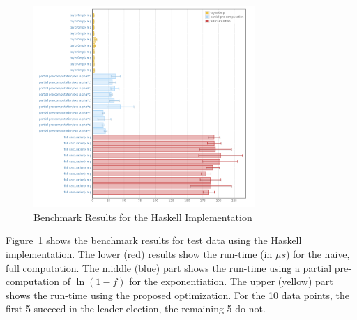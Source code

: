 \documentclass[11pt,a4paper,dvipsnames]{article}
\theoremstyle{definition}
\theoremstyle{definition}
\begin{document}
\begin{figure}[ht]
  \centering
  \includegraphics[width=0.75\textwidth]{haskell.png}
  \caption{Benchmark Results for the Haskell Implementation}
  \label{fig:haskell-optimization-results}
\end{figure}

Figure~\ref{fig:haskell-optimization-results} shows the benchmark results for
test data using the Haskell implementation. The lower (red) results show the
run-time (in $\mu s$) for the naive, full computation. The middle (blue) part
shows the run-time using a partial pre-computation of $\ln (1-f)$ for the
exponentiation. The upper (yellow) part shows the run-time using the proposed
optimization. For the 10 data points, the first 5 succeed in the leader
election, the remaining 5 do not.



\end{document}
